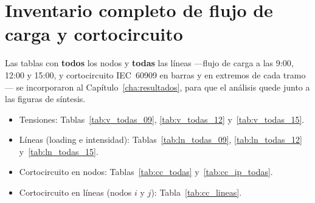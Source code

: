 \chapter{Inventario completo de flujo de carga y cortocircuito}
\label{chap:anexo_inventario}

Las tablas con \textbf{todos} los nodos y \textbf{todas} las líneas ---flujo de carga a las 9:00, 12:00 y 15:00, y cortocircuito IEC~60909 en barras y en extremos de cada tramo--- se incorporaron al Capítulo~\ref{cha:resultados}, para que el análisis quede junto a las figuras de síntesis.

\begin{itemize}
    \item Tensiones: Tablas~\ref{tab:v_todas_09}, \ref{tab:v_todas_12} y~\ref{tab:v_todas_15}.
    \item Líneas (loading e intensidad): Tablas~\ref{tab:ln_todas_09}, \ref{tab:ln_todas_12} y~\ref{tab:ln_todas_15}.
    \item Cortocircuito en nodos: Tablas~\ref{tab:cc_todas} y~\ref{tab:cc_ip_todas}.
    \item Cortocircuito en líneas (nodos $i$ y $j$): Tabla~\ref{tab:cc_lineas}.
\end{itemize}
